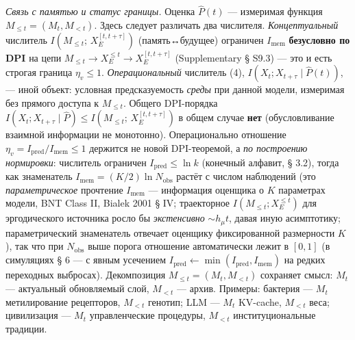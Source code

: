 \documentclass[pdflatex,sn-mathphys-ay]{sn-jnl}
\providecommand{\lt}{<}\providecommand{\gt}{>}
\begin{document}
\emph{Связь с памятью и статус границы.} Оценка \(\hat P(t)\) --- измеримая функция \(M_{\le t} = (M_t, M_{\lt t})\). Здесь следует различать два числителя. \emph{Концептуальный} числитель \(I(M_{\le t};\, X_E^{[t,t+\tau]})\) (память↔будущее) ограничен \(I_{\text{mem}}\) \textbf{безусловно по DPI} на цепи \(M_{\le t} \to X_E^{\le t} \to X_E^{[t,t+\tau]}\) (Supplementary § S9.3) --- это и есть строгая граница \(\eta_v \le 1\). \emph{Операциональный} числитель (4), \(I(X_t; X_{t+\tau}\mid\hat P(t))\), --- иной объект: условная предсказуемость \emph{среды} при данной модели, измеримая без прямого доступа к \(M_{\le t}\). Общего DPI-порядка \(I(X_t; X_{t+\tau}\mid\hat P) \le I(M_{\le t};\, X_E^{[t,t+\tau]})\) в общем случае \textbf{нет} (обусловливание взаимной информации не монотонно). Операционально отношение \(\eta_v = I_{\text{pred}}/I_{\text{mem}} \le 1\) держится не новой DPI-теоремой, а \emph{по построению нормировки}: числитель ограничен \(I_{\text{pred}} \le \ln k\) (конечный алфавит, § 3.2), тогда как знаменатель \(I_{\text{mem}} = (K/2)\ln N_{\text{obs}}\) растёт с числом наблюдений (это \emph{параметрическое} прочтение \(I_{\text{mem}}\) --- информация оценщика о \(K\) параметрах модели, BNT Class II, Bialek 2001 § IV; траекторное \(I(M_{\le t}; X_E^{\le t})\) для эргодического источника росло бы \emph{экстенсивно} \(\sim h_\mu t\), давая иную асимптотику; параметрический знаменатель отвечает оценщику фиксированной размерности \(K\)), так что при \(N_{\text{obs}}\) выше порога отношение автоматически лежит в \([0,1]\) (в симуляциях § 6 --- с явным усечением \(I_{\text{pred}} \gets \min(I_{\text{pred}}, I_{\text{mem}})\) на редких переходных выбросах). Декомпозиция \(M_{\le t} = (M_t, M_{\lt t})\) сохраняет смысл: \(M_t\) --- актуальный обновляемый слой, \(M_{\lt t}\) --- архив. Примеры: бактерия --- \(M_t\) метилирование рецепторов, \(M_{\lt t}\) генотип; LLM --- \(M_t\) KV-cache, \(M_{\lt t}\) веса; цивилизация --- \(M_t\) управленческие процедуры, \(M_{\lt t}\) институциональные традиции.
\end{document}
